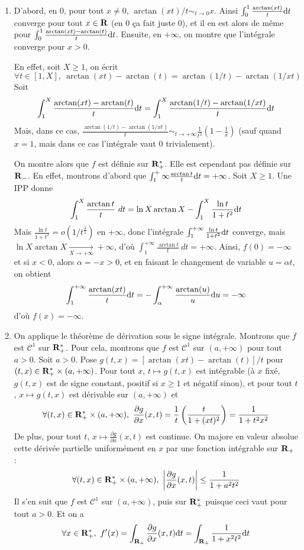 \begin{correction}
	\begin{enumerate}
		\item D'abord, en $0$, pour tout $x\neq 0$, $\arctan(xt)/t\sim_{t\to 0} x$. 
		Ainsi $\int_0^1\frac{\arctan(xt)}t\mathrm{d} t$ converge pour tout $x\in\operatorname{\mathbf{R}}$ (en $0$ ça fait juste $0$),
		et il en est alors de même pour $\int_0^1\frac{\arctan(xt)-\arctan(t)}t\mathrm{d} t$.
		Ensuite, en $+\infty$, on montre que l'intégrale converge pour $x>0$. 
		
		En effet, soit $X\geq 1$, on écrit 
		\[
			\forall t\in[1,X],\ \arctan(xt)-\arctan(t)=\arctan(1/t)-\arctan(1/xt)	
		\]
		Soit 
		\[
			\int_1^X\frac{\arctan(xt)-\arctan(t)}t\mathrm{d} t=\int_1^X\frac{\arctan(1/t)-\arctan(1/xt)}t \mathrm{d} t
		\]
		Mais, dans ce cas, $\frac{\arctan(1/t)-\arctan(1/xt)}t\sim_{t\to +\infty}\frac1{t^2}\left(1-\frac1x\right)$ (sauf quand $x=1$, mais dans ce cas l'intégrale vaut $0$ trivialement).

		On montre alors que $f$ est définie sur ${\mathbf R}_{+}^*$. 
		Elle est cependant pas définie sur $\operatorname{\mathbf{R}}_-$.
		En effet, montrons d'abord que $\int_1^+{\infty}\frac{\arctan t}t\mathrm{d} t=+\infty$.
		Soit $X\geq 1$. Une IPP donne 
		\[
			\int_1^X\frac{\arctan t}t\ dt =\ln X\arctan X-\int_1^X\frac{\ln t}{1+t^2}\mathrm{d} t
		\]
		Mais $\frac{\ln t}{1+t^2}=o(1/t^{\frac32})$ en $+\infty$, donc l'intégrale $\int_1^{+\infty}\frac{\ln t}{1+t^2}\mathrm{d} t$ converge, mais $\ln X\arctan X\xrightarrow[X\to+\infty]{}+\infty$,
		d'où $\int_1^{+\infty}\frac{\arctan t}t\ dt=+\infty$. 
		Ainsi, $f(0)=-\infty$ et si $x<0$, alors $\alpha=-x>0$, et en faisant le changement de variable $u=\alpha t$, on obtient
		\[
			\int_1^{+\infty}\frac{\arctan(xt)}t\mathrm{d} t=-\int_\alpha^{+\infty}\frac{\arctan(u)}u\mathrm{d} u=-\infty
		\]
		d'où $f(x)=-\infty$.

		\item On applique le théorème de dérivation sous le signe intégrale.
		Montrons que $f$ est $\mathcal C^1$ sur ${\mathbf R}_{+}^*$. Pour cela, montrons que $f$ est $\mathcal C^1$
		sur $(a,+\infty)$ pour tout $a>0$.
		Soit $a>0$. Pose $g(t,x)=[\arctan(xt)-\arctan(t)]/t$ pour $(t,x)\in{\mathbf R}_{+}^*\times(a,+\infty)$. 
		Pour tout $x$, $t\mapsto g(t,x)$ est intégrable (à $x$ fixé, $g(t,x)$ est de signe constant, positif si $x\geq 1$ et négatif sinon),
		et pour tout $t$, $x\mapsto g(t,x)$ est dérivable sur $(a,+\infty)$ et 
		\[
			\forall (t,x)\in\Rpe\times(a,+\infty),\ \frac{\partial g}{\partial x}(x,t)=\frac1t\left(\frac{t}{1+(xt)^2}\right)=\frac1{1+t^2x^2}
		\]
		De plus, pour tout $t$, $x\mapsto \frac{\partial g}{\partial x}(x,t)$ est continue. On majore en valeur absolue cette dérivée partielle uniformément en $x$ par une fonction intégrable sur $\operatorname{\mathbf{R}}_+$ :
		\[
			\forall (t,x)\in\Rpe\times(a,+\infty),\ \left|\frac{\partial g}{\partial x}(x,t)\right|\leq \frac1{1+a^2t^2}
		\]
		Il s'en suit que $f$ est $\mathcal C^1$ sur $(a,+\infty)$, puis sur ${\mathbf R}_{+}^*$ puisque ceci vaut pour tout $a>0$.
		Et on a 
		\[
			\forall x\in\Rpe,\ f'(x)=\int_{\R_+}\frac{\partial g}{\partial x}(x,t)\d t=\int_{\R_+}\frac1{1+x^2t^2}\d t
		\]


\end{enumerate}
\end{correction}
